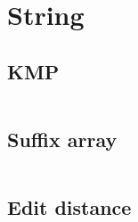 \section{String}
\subsection{KMP}
\inputminted[frame=single,framesep=3pt,tabsize=2,breaklines=true,linenos,label=O(N)]{c++}{string/kmp.cpp}

\subsection{Suffix array}
\inputminted[frame=single,framesep=3pt,tabsize=2,breaklines=true,linenos,label=O(N log(N))]{c++}{string/suffix-array.cpp}

\subsection{Edit distance}
\inputminted[frame=single,framesep=3pt,tabsize=2,breaklines=true,linenos,label=O($N^2$)]{c++}{string/edit-distance.cpp}